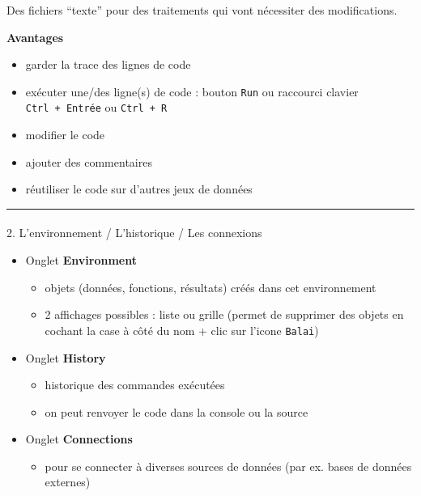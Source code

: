 \documentclass[
  french,
  10pt,
  a4paper,
]{article}
\makeatletter
\let\oldparagraph\paragraph
\renewcommand{\paragraph}{
    \@ifstar
      \xxxParagraphStar
      \xxxParagraphNoStar
  }
\newcommand{\xxxParagraphStar}[1]{\oldparagraph*{#1}\mbox{}}
\newcommand{\xxxParagraphNoStar}[1]{\oldparagraph{#1}\mbox{}}
\providecommand{\tightlist}{%
  \setlength{\itemsep}{0pt}\setlength{\parskip}{0pt}}
\makeatother
\begin{document}
Des fichiers ``texte'' pour des traitements qui vont nécessiter des
modifications.

\textbf{Avantages}

\begin{itemize}
\tightlist
\item
  garder la trace des lignes de code
\item
  exécuter une/des ligne(s) de code : bouton \texttt{Run} ou raccourci
  clavier \texttt{Ctrl\ +\ Entrée} ou \texttt{Ctrl\ +\ R}
\item
  modifier le code
\item
  ajouter des commentaires
\item
  réutiliser le code sur d'autres jeux de données
\end{itemize}

\begin{center}\rule{0.5\linewidth}{0.5pt}\end{center}

\paragraph{2. L'environnement / L'historique / Les
connexions}\label{lenvironnement-lhistorique-les-connexions}

\begin{itemize}
\item
  Onglet \textbf{Environment}

  \begin{itemize}
  \tightlist
  \item
    objets (données, fonctions, résultats) créés dans cet environnement
  \item
    2 affichages possibles : liste ou grille (permet de supprimer des
    objets en cochant la case à côté du nom + clic sur l'icone
    \texttt{Balai})
  \end{itemize}
\item
  Onglet \textbf{History}

  \begin{itemize}
  \tightlist
  \item
    historique des commandes exécutées
  \item
    on peut renvoyer le code dans la console ou la source
  \end{itemize}
\item
  Onglet \textbf{Connections}

  \begin{itemize}
  \tightlist
  \item
    pour se connecter à diverses sources de données (par ex. bases de
    données externes)
  \end{itemize}
\end{itemize}
\end{document}
